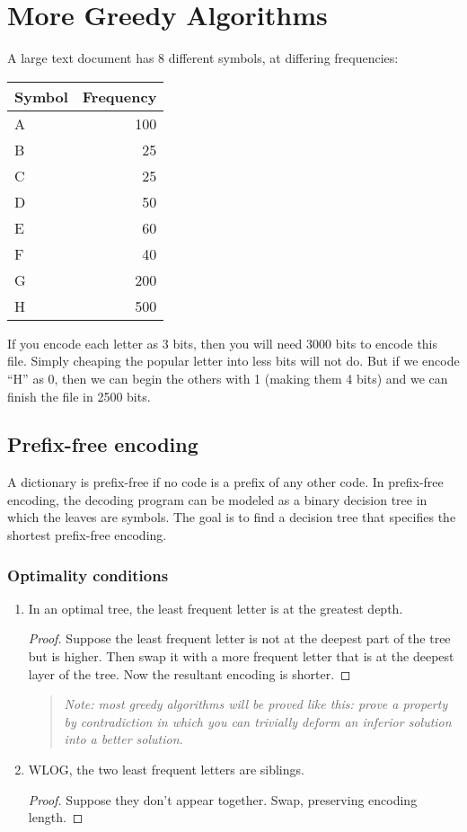 \chapter{More Greedy Algorithms}
A large text document has 8 different symbols, at differing frequencies:

\noindent
\begin{tabular}{lr}
	Symbol & Frequency \\\hline
	A & 100 \\
	B & 25 \\
	C & 25 \\
	D & 50 \\
	E & 60 \\ 
	F & 40 \\
	G & 200 \\
	H & 500
\end{tabular}

If you encode each letter as 3 bits, then you will need 3000 bits to encode this file. Simply cheaping the popular letter into less bits will not do. But if we encode ``H'' as 0, then we can begin the others with 1 (making them 4 bits) and we can finish the file in 2500 bits.

\section{Prefix-free encoding}
A dictionary is prefix-free if no code is a prefix of any other code.
In prefix-free encoding, the decoding program can be modeled as a binary decision tree
in which the leaves are symbols. The goal is to find a decision tree that specifies the shortest prefix-free
encoding.

\subsection{Optimality conditions}
\begin{enumerate}
	\item In an optimal tree, the least frequent letter is at the greatest depth.
	
	\begin{proof}
		Suppose the least frequent letter is not at the deepest part of the tree but is higher. Then swap it with a more frequent letter that is at the deepest layer of the tree. Now the resultant encoding is shorter.
	\end{proof}
	
	\begin{quotation}
		\em Note: most greedy algorithms will be proved like this:
		prove a property by contradiction in which you can trivially deform an inferior solution into
		a better solution.
	\end{quotation}
	
	\item WLOG, the two least frequent letters are siblings.
	
	\begin{proof}
		Suppose they don't appear together. Swap, preserving encoding length.
	\end{proof}
\end{enumerate}

